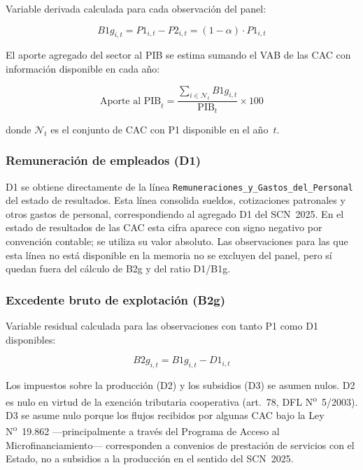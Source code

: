 Variable derivada calculada para cada observación del panel:

\begin{equation}
B1g_{i,t} = P1_{i,t} - P2_{i,t} = (1 - \alpha)\cdot P1_{i,t}
\label{eq:b1g}
\end{equation}

\noindent El aporte agregado del sector al PIB se estima
sumando el VAB de las CAC con información disponible en cada
año:

\begin{equation}
\text{Aporte al PIB}_t =
\frac{\displaystyle\sum_{i \in \mathcal{N}_t} B1g_{i,t}}
     {\text{PIB}_t} \times 100
\label{eq:aporte}
\end{equation}

\noindent donde $\mathcal{N}_t$ es el conjunto de CAC con
P1 disponible en el año~$t$.

\subsubsection*{Remuneración de empleados (D1)}

D1 se obtiene directamente de la línea
\texttt{Remuneraciones\_y\_Gastos\_del\_Personal} del
estado de resultados. Esta línea consolida sueldos,
cotizaciones patronales y otros gastos de personal,
correspondiendo al agregado D1 del SCN~2025. En el estado
de resultados de las CAC esta cifra aparece con signo
negativo por convención contable; se utiliza su valor
absoluto. Las observaciones para las que esta línea no
está disponible en la memoria no se excluyen del panel,
pero sí quedan fuera del cálculo de B2g y del ratio
D1/B1g.

\subsubsection*{Excedente bruto de explotación (B2g)}

Variable residual calculada para las observaciones con
tanto P1 como D1 disponibles:

\begin{equation}
B2g_{i,t} = B1g_{i,t} - D1_{i,t}
\label{eq:b2g}
\end{equation}

\noindent Los impuestos sobre la producción (D2) y los
subsidios (D3) se asumen nulos. D2 es nulo en virtud de la
exención tributaria cooperativa (art.~78, DFL
N\textsuperscript{o}~5/2003). D3 se asume nulo porque los
flujos recibidos por algunas CAC bajo la Ley
N\textsuperscript{o}~19.862 ---principalmente a través del
Programa de Acceso al Microfinanciamiento--- corresponden a
convenios de prestación de servicios con el Estado, no a
subsidios a la producción en el sentido del SCN~2025.

